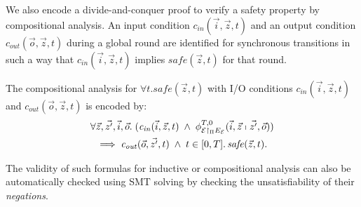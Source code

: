 We also encode a divide-and-conquer proof
to verify a safety property by compositional analysis. %
An input condition $\mathit{c}_\mathit{in}(\vec{i},\vec{z},t)$
and an output condition $\mathit{c}_\mathit{out}(\vec{o},\vec{z},t)$ 
during a global round
are identified for synchronous transitions
in such a way 
that $\mathit{c}_\mathit{in}(\vec{i},\vec{z},t)$ implies %
$\mathit{safe}(\vec{z},t)$ for that round.


\begin{definition} \label{def:compositional}
The compositional analysis for $\forall t.  \mathit{safe}(\vec{z},t)$
with I/O conditions $\mathit{c}_\mathit{in}(\vec{i},\vec{z},t)$ and $\mathit{c}_\mathit{out}(\vec{o},\vec{z},t)$
is encoded by:
\begin{multline*}
\forall \vec{z}, \vec{z'}, \vec{i}, \vec{o}.\;
(\mathit{c}_\mathit{in}(\vec{i},\vec{z},t)
\;\wedge\;
\phi_{\mathcal{E} \restriction_{\Pi} E_\mathcal{E}}^{T,0}(
	\vec{i}, \vec{z}
	\shortmid 
	\vec{z'}, \vec{o})
)
\\
\implies
\mathit{c}_\mathit{out}(\vec{o},\vec{z'},t) \;\wedge\; t \in [0,T].\, \mathit{safe}(\vec{z},t).
\end{multline*}
\end{definition}

The validity of such formulas for inductive or compositional  analysis can also be automatically checked 
using SMT solving
by checking the unsatisfiability of their \emph{negations}.









